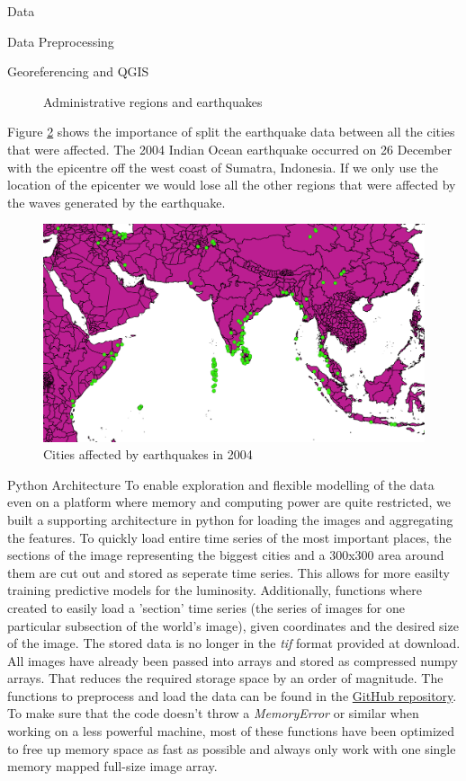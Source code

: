 \documentclass[12.5pt,fleqn,leqno,letterpaper]{article}
\begin{document}
\begin{section}{Data}
\begin{subsection}{Data Preprocessing}
\begin{subsubsection}{Georeferencing and QGIS}
\begin{figure}[htbp]
        \caption{Administrative regions and earthquakes}\label{eq}
      \end{figure}
      Figure \ref{eq2} shows the importance of split the earthquake data between all the cities that were affected. The 2004 Indian Ocean earthquake occurred on 26 December with the epicentre off the west coast of Sumatra, Indonesia.  If we only use the location of the epicenter we would lose all the other regions that were affected by the waves generated by the earthquake. 			
      \begin{figure}[H]
        \centering
        \includegraphics[width=1\linewidth]{tsunami_2004}
        \caption{Cities affected by earthquakes in 2004}\label{eq2}
      \end{figure}			
    \end{subsubsection}

    \begin{subsubsection}{Python Architecture}
      To enable exploration and flexible modelling of the data even on a platform where memory and computing power are quite restricted, we built a supporting architecture in python for loading the images and aggregating the features.
      To quickly load entire time series of the most important places, the sections of the image representing the biggest cities and a 300x300 area around them are cut out and stored as seperate time series. This allows for more easilty training predictive models for the luminosity.
      Additionally, functions where created to easily load a 'section' time series (the series of images for one particular subsection of the world's image), given coordinates and the desired size of the image.
      The stored data is no longer in the \textit{tif} format provided at download. All images have already been passed into arrays and stored as compressed numpy arrays. That reduces the required storage space by an order of magnitude.
      The functions to preprocess and load the data can be found in the \hyperref[www.github.com/westermann/luminosity]{GitHub repository}. To make sure that the code doesn't throw a \textit{MemoryError} or similar when working on a less powerful machine, most of these functions have been optimized to free up memory space as fast as possible and always only work with one single memory mapped full-size image array.
    \end{subsubsection}


\end{subsection}
\end{section}
\end{document}
